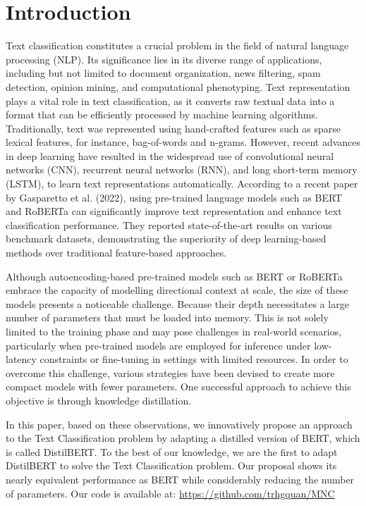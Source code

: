 \documentclass[sn-mathphys,Numbered]{sn-jnl}%
\theoremstyle{thmstyleone}%
\theoremstyle{thmstyletwo}%
\theoremstyle{thmstylethree}%
\begin{document}
\section{Introduction}\label{introduction}
Text classification constitutes a crucial problem in the field of natural language processing (NLP). Its significance lies in its diverse range of applications, including but not limited to document organization, news filtering, spam detection, opinion mining, and computational phenotyping\cite{Aggarwal2012, Zeng2019}. Text representation plays a vital role in text classification, as it converts raw textual data into a format that can be efficiently processed by machine learning algorithms. Traditionally, text was represented using hand-crafted features such as sparse lexical features, for instance, bag-of-words and n-grams. However, recent advances in deep learning have resulted in the widespread use of convolutional neural networks (CNN)\cite{LeCun1998}, recurrent neural networks (RNN)\cite{Rumelhart1987}, and long short-term memory (LSTM)\cite{Hochreiter1997}, to learn text representations automatically. According to a recent paper by Gasparetto et al. (2022)\cite{Gasparetto2022}, using pre-trained language models such as BERT and RoBERTa can significantly improve text representation and enhance text classification performance. They reported state-of-the-art results on various benchmark datasets, demonstrating the superiority of deep learning-based methods over traditional feature-based approaches.

Although autoencoding-based pre-trained models such as BERT or RoBERTa embrace the capacity of modelling directional context at scale, the size of these models presents a noticeable challenge. Because their depth necessitates a large number of parameters that must be loaded into memory. This is not solely limited to the training phase and may pose challenges in real-world scenarios, particularly when pre-trained models are employed for inference under low-latency constraints or fine-tuning in settings with limited resources. In order to overcome this challenge, various strategies have been devised to create more compact models with fewer parameters. One successful approach to achieve this objective is through knowledge distillation. 

In this paper, based on these observations, we innovatively propose an approach to the Text Classification problem by adapting a distilled version of BERT, which is called DistilBERT. To the best of our knowledge, we are the first to adapt DistilBERT to solve the Text Classification problem. Our proposal shows its nearly equivalent performance as BERT while considerably reducing the number of parameters. Our code is available at: \href{https://github.com/trhgquan/MNC}{https://github.com/trhgquan/MNC}
\end{document}
